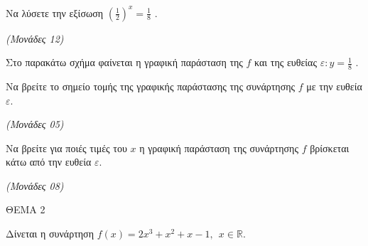 \documentclass[11pt,a4paper,twoside]{book}
\newcommand{\monades}[1]{\hfill \textit{(Μονάδες #1)}}
\begin{document}
\begin{alist}
\item Να λύσετε την εξίσωση $\left( \frac{1}{2} \right)^{x} = \frac{1}{8}$ .

\monades{12}

Στο παρακάτω σχήμα φαίνεται η γραφική παράσταση της $f$ και της ευθείας $\varepsilon:y = \frac{1}{8}$ .


\begin{center}


\end{center}


\item Να βρείτε το σημείο τομής της γραφικής παράστασης της συνάρτησης $f$ με την ευθεία $\varepsilon$.

\monades{05}

\item Να βρείτε για ποιές τιμές του $x$ η γραφική παράσταση της συνάρτησης $f$ βρίσκεται κάτω από την ευθεία $\varepsilon$.

\monades{08}
\end{alist}

\vspace{4mm}

ΘΕΜΑ 2

Δίνεται η συνάρτηση $f(x) = 2x^{3} + x^{2} + x - 1,\ \ x \in \mathbb{R}$.
\end{document}
